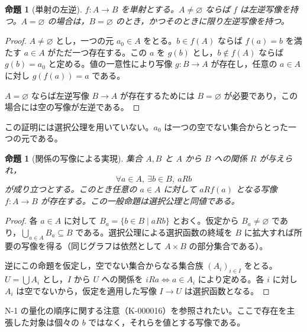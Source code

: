 \documentclass[a5paper,10pt,dvipdfmx]{jsarticle}
\theoremstyle{definition}
\theoremstyle{plain}
\newtheorem{prop}[ruledef]{命題}
\newcommand{\iffc}{\Longleftrightarrow}
\begin{document}
\begin{prop}[単射の左逆]\label{k64}
$f:A\to B$ を単射とする。$A\ne\varnothing$ ならば $f$ は左逆写像を持つ。$A=\varnothing$ の場合は，$B=\varnothing$ のとき，かつそのときに限り左逆写像を持つ。
\end{prop}
\begin{proof}
$A\ne\varnothing$ とし，一つの元 $a_0\in A$ をとる。$b\in f(A)$ ならば $f(a)=b$ を満たす $a\in A$ がただ一つ存在する。この $a$ を $g(b)$ とし，$b\notin f(A)$ ならば $g(b)=a_0$ と定める。値の一意性により写像 $g:B\to A$ が存在し，任意の $a\in A$ に対し $g(f(a))=a$ である。

$A=\varnothing$ ならば左逆写像 $B\to A$ が存在するためには $B=\varnothing$ が必要であり，この場合には空の写像が左逆である。
\end{proof}
この証明には選択公理を用いていない。$a_0$ は一つの空でない集合からとった一つの元である。
\begin{prop}[関係の写像による実現]\label{k65}
集合 $A,B$ と $A$ から $B$ への関係 $R$ が与えられ，
\[
 \forall a\in A,\ \exists b\in B,\ aRb
\]
が成り立つとする。このとき任意の $a\in A$ に対して $aRf(a)$ となる写像 $f:A\to B$ が存在する。この一般命題は選択公理と同値である。
\end{prop}
\begin{proof}
各 $a\in A$ に対して $B_a=\{b\in B\mid aRb\}$ とおく。仮定から $B_a\ne\varnothing$ であり，$\bigcup_{a\in A}B_a\subseteq B$ である。選択公理による選択函数の終域を $B$ に拡大すれば所要の写像を得る（同じグラフは依然として $A\times B$ の部分集合である）。

逆にこの命題を仮定し，空でない集合からなる集合族 $(A_i)_{i\in I}$ をとる。$U=\bigcup A_i$ とし，$I$ から $U$ への関係を $iRa\iffc a\in A_i$ により定める。各 $i$ に対し $A_i$ は空でないから，仮定を適用した写像 $I\to U$ は選択函数となる。
\end{proof}
N-1 の量化の順序に関する注意（K-000016）を参照されたい。ここで存在を主張した対象は個々の $b$ ではなく，それらを値とする写像である。
\end{document}
